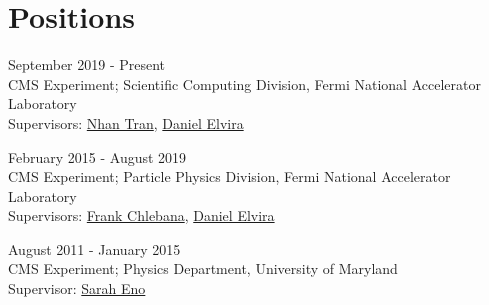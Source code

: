 \section{Positions}
\begin{description}[leftmargin=12pt,font=\normalfont\textit]
\item[Associate Scientist] \hfill September 2019 - Present\\
CMS Experiment; Scientific Computing Division, Fermi National Accelerator Laboratory \\
Supervisors: \href{mailto:ntran@fnal.gov}{Nhan Tran}, \href{mailto:daniel@fnal.gov}{Daniel Elvira}
\item[Postdoctoral Research Associate] \hfill February 2015 - August 2019 \\
CMS Experiment; Particle Physics Division, Fermi National Accelerator Laboratory \\
Supervisors: \href{mailto:chlebana@fnal.gov}{Frank Chlebana}, \href{mailto:daniel@fnal.gov}{Daniel Elvira}
\item[Graduate Research Assistant] \hfill August 2011 - January 2015 \\
CMS Experiment; Physics Department, University of Maryland \\
Supervisor: \href{mailto:eno@umd.edu}{Sarah Eno}
\end{description}
